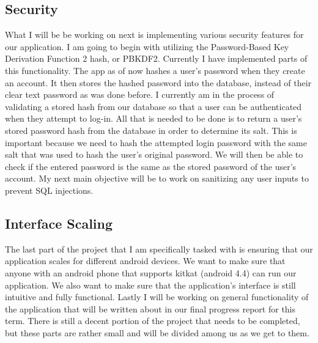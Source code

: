 \documentclass[onecolumn, draftclsnofoot,10pt, compsoc]{IEEEtran}
\begin{document}
	\subsection{Security}
		What I will be be working on next is implementing various security features for our application. I am going to begin with utilizing the Password-Based Key Derivation Function 2 hash, or PBKDF2. Currently I have implemented parts of this functionality. The app as of now hashes a user’s password when they create an account. It then stores the hashed password into the database, instead of their clear text password as was done before. I currently am in the process of validating a stored hash from our database so that a user can be authenticated when they attempt to log-in. All that is needed to be done is to return a user’s stored password hash from the database in order to determine its salt. This is important because we need to hash the attempted login password with the same salt that was used to hash the user’s original password. We will then be able to check if the entered password is the same as the stored password of the user’s account.  My next main objective will be to work on sanitizing any user inputs to prevent SQL injections.

	\subsection{Interface Scaling}
		The last part of the project that I am specifically tasked with is ensuring that our application scales for different android devices. We want to make sure that anyone with an android phone that supports kitkat (android 4.4) can run our application. We also want to make sure that the application’s interface is still intuitive and fully functional. Lastly I will be working on general functionality of the application that will be written about in our final progress report for this term. There is still a decent portion of the project that needs to be completed, but these parts are rather small and will be divided among us as we get to them.
\end{document}
